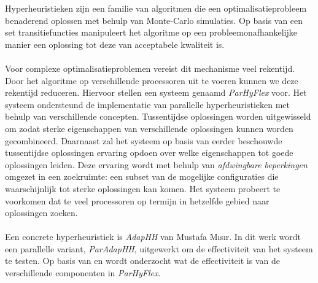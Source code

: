 Hyperheuristieken zijn een familie van algoritmen die een optimalisatieprobleem benaderend oplossen met behulp van Monte-Carlo simulaties. Op basis van een set transitiefuncties manipuleert het algoritme op een probleemonafhankelijke manier een oplossing tot deze van acceptabele kwaliteit is.

\paragraph{}
Voor complexe optimalisatieproblemen vereist dit mechanisme veel rekentijd. Door het algoritme op verschillende processoren uit te voeren kunnen we deze rekentijd reduceren. Hiervoor stellen een systeem genaamd \emph{ParHyFlex} voor. Het systeem ondersteund de implementatie van parallelle hyperheuristieken met behulp van verschillende concepten. Tussentijdse oplossingen worden uitgewisseld om zodat sterke eigenschappen van verschillende oplossingen kunnen worden gecombineerd. Daarnaast zal het systeem op basis van eerder beschouwde tussentijdse oplossingen ervaring opdoen over welke eigenschappen tot goede oplossingen leiden. Deze ervaring wordt met behulp van \emph{afdwingbare beperkingen} omgezet in een zoekruimte: een subset van de mogelijke configuraties die waarschijnlijk tot sterke oplossingen kan komen. Het systeem probeert te voorkomen dat te veel processoren op termijn in hetzelfde gebied naar oplossingen zoeken.

\paragraph{}
Een concrete hyperheuristiek is \emph{AdapHH} van Mustafa M\i{}s\i{}r. In dit werk wordt een parallelle variant, \emph{ParAdapHH}, uitgewerkt om de effectiviteit van het systeem te testen. Op basis van  en  wordt onderzocht wat de effectiviteit is van de verschillende componenten in \emph{ParHyFlex}.